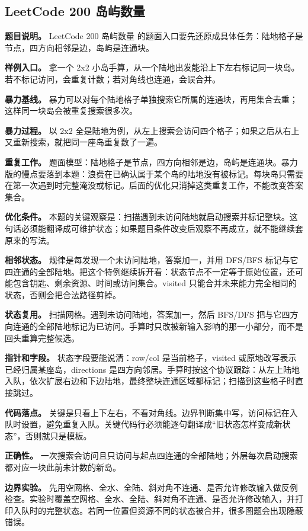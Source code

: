 \subsection{LeetCode 200 岛屿数量}

\textbf{题目说明。} LeetCode 200 岛屿数量 的题面入口要先还原成具体任务：陆地格子是节点，四方向相邻是边，岛屿是连通块。

\textbf{样例入口。} 拿一个 2x2 小岛手算，从一个陆地出发能沿上下左右标记同一块岛。若不标记访问，会重复计数；若对角线也连通，会误合并。

\textbf{暴力基线。} 暴力可以对每个陆地格子单独搜索它所属的连通块，再用集合去重；这样同一块岛会被重复搜索很多次。

\textbf{暴力过程。} 以 2x2 全是陆地为例，从左上搜索会访问四个格子；如果之后从右上又重新搜索，就把同一座岛重复数了一遍。

\textbf{重复工作。} 题面模型：陆地格子是节点，四方向相邻是边，岛屿是连通块。暴力版的慢点要落到本题：浪费在已确认属于某个岛的陆地没有被标记。每块岛只需要在第一次遇到时完整淹没或标记。后面的优化只消掉这类重复工作，不能改变答案集合。

\textbf{优化条件。} 本题的关键观察是：扫描遇到未访问陆地就启动搜索并标记整块。这句话必须能翻译成可维护状态；如果题目条件改变后观察不再成立，就不能继续套原来的写法。

\textbf{相邻状态。} 规律是每发现一个未访问陆地，答案加一，并用 DFS/BFS 标记与它四连通的全部陆地。把这个特例继续拆开看：状态节点不一定等于原始位置，还可能包含钥匙、剩余资源、时间或访问集合。visited 只能合并未来能力完全相同的状态，否则会把合法路径剪掉。

\textbf{状态复用。} 扫描网格。遇到未访问陆地，答案加一，然后 BFS/DFS 把与它四方向连通的全部陆地标记为已访问。手算时只改被新输入影响的那一小部分，而不是回头重算完整候选。

\textbf{指针和字段。} 状态字段要能说清：row/col 是当前格子，visited 或原地改写表示已经归属某座岛，directions 是四方向邻居。手算时按这个协议跟踪：从左上陆地入队，依次扩展右边和下边陆地，最终整块连通区域都标记；扫描到这些格子时直接跳过。

\textbf{代码落点。} 关键是只看上下左右，不看对角线。边界判断集中写，访问标记在入队时设置，避免重复入队。关键代码行必须能逐句翻译成“旧状态怎样变成新状态”，否则就只是模板。

\textbf{正确性。} 一次搜索会访问且只访问与起点四连通的全部陆地；外层每次启动搜索都对应一块此前未计数的新岛。

\textbf{边界实验。} 先用空网格、全水、全陆、斜对角不连通、是否允许修改输入做反例检查。实验时覆盖空网格、全水、全陆、斜对角不连通、是否允许修改输入，并打印入队时的完整状态。若同一位置但资源不同的状态被合并，很多图题会出现隐蔽错误。

